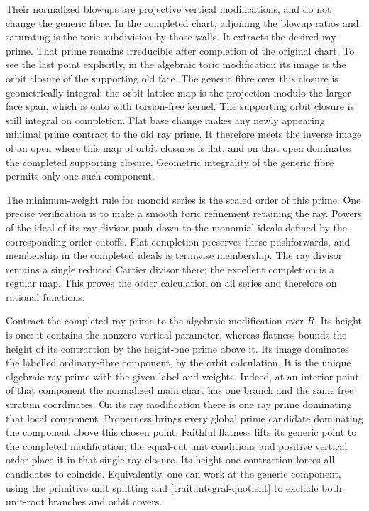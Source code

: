 Their normalized blowups are projective vertical modifications,
and do not change the generic fibre.  In the completed chart,
adjoining the blowup ratios and saturating is the toric
subdivision by those walls.  It extracts the desired ray prime.
That prime remains irreducible after completion of the original
chart.  To see the last point explicitly, in the algebraic
toric modification its image is the orbit closure of the
supporting old face.  The generic fibre over this closure is
geometrically integral: the orbit-lattice map is the projection
modulo the larger face span, which is onto with torsion-free
kernel.  The supporting orbit closure is still integral on
completion.  Flat base change makes any newly appearing minimal
prime contract to the old ray prime.  It therefore meets the
inverse image of an open where this map of orbit closures is
flat, and on that open dominates the completed supporting
closure.  Geometric integrality of the generic fibre permits
only one such component.

The minimum-weight rule for monoid series is the scaled order
of this prime.  One precise verification is to make a smooth
toric refinement retaining the ray.  Powers of the ideal of
its ray divisor push down to the monomial ideals defined by
the corresponding order cutoffs.  Flat completion preserves
these pushforwards, and membership in the completed ideals is
termwise membership.  The ray divisor remains a single reduced
Cartier divisor there; the excellent completion is a regular
map.  This proves the order calculation on all series and
therefore on rational functions.

Contract the completed ray prime to the algebraic modification
over \(R\).  Its height is one: it contains the nonzero vertical
parameter, whereas flatness bounds the height of its
contraction by the height-one prime above it.  Its image
dominates the labelled ordinary-fibre component, by the
orbit calculation.  It is the unique algebraic ray prime
with the given label and weights.  Indeed, at an interior
point of that component the normalized main chart has one
branch and the same free stratum coordinates.  On its ray
modification there is one ray prime dominating that local
component.  Properness brings every global prime candidate
dominating the component above this chosen point.  Faithful
flatness lifts its generic point to the completed modification;
the equal-cut unit conditions and positive vertical order
place it in that single ray closure.  Its height-one
contraction forces all candidates to coincide.  Equivalently,
one can work at the generic component, using the primitive
unit splitting and \eqref{trait:integral-quotient} to exclude
both unit-root branches and orbit covers.

